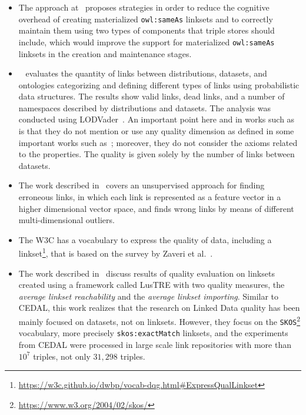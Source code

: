 \begin{itemize}
	\item The approach at~\cite{casanova2014materialized} proposes strategies in order to reduce the cognitive overhead of creating materialized \texttt{owl:sameAs} linksets and to correctly maintain them using two types of components that triple stores should include, which would improve the support for materialized \texttt{owl:sameAs} linksets in the creation and maintenance stages.
	
	\item~\cite{netoassessing} evaluates the quantity of links between distributions, datasets, and ontologies categorizing and defining different types of links using probabilistic data structures.
	The results show valid links, dead links, and a number of namespaces described by distributions and datasets. The analysis was conducted using LODVader~\cite{baron2016lodvader}.
	An important point here and in works such as~\cite{scharffe2009rdf,beek2014lod,makela2014aether} is that they do not mention or use any quality dimension as defined in some important works such as~\cite{zaveri2015quality,albertoni2015linkset}; moreover, they do not consider the axioms related to the properties. The quality is given solely by the number of links between datasets.
	
	
	\item The work described in~\cite{paulheim2014identifying} covers an unsupervised approach for finding erroneous links, in which each link is represented as a feature vector in a higher dimensional vector space, and finds wrong links by means of different multi-dimensional outliers.
	
	\item The W3C has a vocabulary to express the quality of data, including a linkset\footnote{\url{https://w3c.github.io/dwbp/vocab-dqg.html\#ExpressQualLinkset}}, that is based on the survey by Zaveri et al.~\cite{zaveri2015quality}.
	
	\item The work described in~\cite{albertoni2016linkset} discuss results of quality evaluation on linksets created using a framework called LusTRE with two quality measures, the \textit{average linkset reachability} and the \textit{average linkset importing}. 
    Similar to CEDAL, this work realizes that the research on Linked Data quality has been mainly focused on datasets, not on linksets.
	However, they focus on the \texttt{SKOS}\footnote{\url{https://www.w3.org/2004/02/skos/}} vocabulary, more precisely \texttt{skos:exactMatch} linksets, and the experiments from CEDAL were processed in large scale link repositories with more than $10^7$ triples, not only $31,298$ triples. 
	

\end{itemize}
